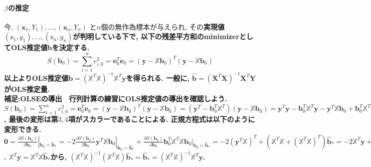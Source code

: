 \documentclass[paper=a4paper,fontsize=10pt]{jlreq}
\begin{document}
\paragraph{$\beta$の推定}
今, $(\mathbf{x}_{1}, Y_1), \dots, (\mathbf{x}_{n}, Y_n)$ と$n$個の無作為標本が与えられ, その\rmfamily\mcfamily\bfseries{実現値}\mdseries$(\mathbb{x}_{1}, y_1), \dots, (\mathbb{x}_{n}, y_n)$が判明している下で, 以下の残差平方和のminimizerとしてOLS推定値$\mathbf{b}$を決定する.
\begin{equation*}
  S(\mathbf{b}_{0})=\sum_{i = 1}^{n} e_{i,0}^{2}=\mathbf{e}_{0}^{T}\mathbf{e}_{0}=(\mathbf{y}-\mathbb{X}\mathbf{b}_{0})^{T}(\mathbf{y}-\mathbb{X}\mathbf{b}_{0})
\end{equation*}
以上よりOLS推定値$\mathbf{b}=(\mathbb{X}^{T}\mathbb{X})^{-1}\mathbb{X}^{T}\mathbf{y}$を得られる. 一般に, $\hat{\mathbf{b}}=(\mathbf{X}^{T}\mathbf{X})^{-1}\mathbf{X}^{T}\mathbf{Y}$がOLS推定量.\\

\rmfamily\mcfamily\bfseries{補足:OLSEの導出}\mdseries　行列計算の練習にOLS推定値の導出を確認しよう. $S(\mathbf{b}_{0})=\sum_{i = 1}^{n} e_{i,0}^{2}=\mathbf{e}_{0}^{T}\mathbf{e}_{0}=(\mathbf{y}-\mathbb{X}\mathbf{b}_{0})^{T}(\mathbf{y}-\mathbb{X}\mathbf{b}_{0})=(\mathbf{y}^{T}-\mathbf{b}_{0}^{T}\mathbb{X}^{T})(\mathbf{y}-\mathbb{X}\mathbf{b}_{0})=\mathbf{y}^{T}\mathbf{y}-\mathbf{b}_{0}^{T}\mathbb{X}^{T}\mathbf{y}-\mathbf{y}^{T}\mathbb{X}\mathbf{b}_{0}+\mathbf{b}_{0}^{T}\mathbb{X}^{T}\mathbb{X}\mathbf{b}_{0}=\mathbf{y}^{T}\mathbf{y}-2\mathbf{y}^{T}\mathbb{X}\mathbf{b}_{0}+\mathbf{b}_{0}^{T}\mathbb{X}^{T}\mathbb{X}\mathbf{b}_{0}$, 最後の変形は第$3,4$項がスカラーであることによる. 正規方程式は以下のように変形できる. $\mathbf{0}=\frac{\partial S(\mathbf{b}_{0})}{\partial\mathbf{b}_0}|_{\mathbf{b}_0=\hat{\mathbf{b}}_*}=-2\frac{\partial S(\mathbf{b}_{0})}{\partial\mathbf{b}_0}\mathbf{y}^{T}\mathbb{X}\mathbf{b}_{0}|_{\mathbf{b}_0=\hat{\mathbf{b}}_*}+\frac{\partial S(\mathbf{b}_{0})}{\partial\mathbf{b}_0}\mathbf{b}_{0}^{T}\mathbb{X}^{T}\mathbb{X}\mathbf{b}_{0}|_{\mathbf{b}_0=\hat{\mathbf{b}}_*}=-2(\mathbf{y}^{T}\mathbb{X})^{T}+(\mathbb{X}^{T}\mathbb{X}+(\mathbb{X}^{T}\mathbb{X})^{T})\hat{\mathbf{b}}_*=-2\mathbb{X}^{T}\mathbf{y}+2\mathbb{X}^{T}\mathbb{X}\hat{\mathbf{b}}_*$. $\mathbb{X}^{T}\mathbf{y}=\mathbb{X}^{T}\mathbb{X}\hat{\mathbf{b}}_*$から, $(\mathbb{X}^{T}\mathbb{X})^{-1}(\mathbb{X}^{T}\mathbb{X})\hat{\mathbf{b}}_*=\hat{\mathbf{b}}_*=(\mathbb{X}^{T}\mathbb{X})^{-1}\mathbb{X}^{T}\mathbf{y}$.\\
\end{document}
